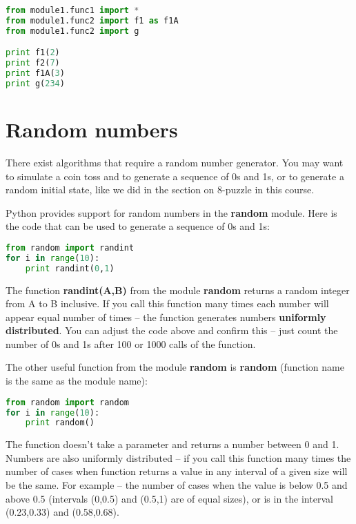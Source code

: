 \begin{lstlisting}[language=Python,style=codelst2,caption={Python: accessing module functions - 3}]
from module1.func1 import *
from module1.func2 import f1 as f1A
from module1.func2 import g

print f1(2)
print f2(7)
print f1A(3)
print g(234)
\end{lstlisting}

\section{Random numbers}

There exist algorithms that require a random number generator.
You may want to simulate a coin toss and to generate a sequence
of 0s and 1s, or to generate a random initial state, like we did in
the section on 8-puzzle in this course. 

Python provides support for random numbers in the \textbf{random}
module. Here is the code that can be used to generate a sequence of
0s and 1s:

\newpage

\begin{lstlisting}[language=Python,style=codelst2,caption={Python: random numbers, simulating a coin toss}]
from random import randint
for i in range(10):
    print randint(0,1)
\end{lstlisting}
The function \textbf{randint(A,B)} from the module \textbf{random}
returns a random integer from A to B inclusive. If you call this
function many times each number will appear equal number of times --
the function generates numbers \textbf{uniformly distributed}.
You can adjust the code above and confirm this -- just count the number 
of 0s and 1s after 100 or 1000 calls of the function.

The other useful function from the module \textbf{random} is
\textbf{random} (function name is the same as the module name):

\begin{lstlisting}[language=Python,style=codelst2,caption={Python: random numbers in the interval (0,1)}]
from random import random
for i in range(10):
    print random()
\end{lstlisting}
The function doesn't take a parameter and returns a number between 0 and 1.
Numbers are also uniformly distributed -- if you call this function 
many times the number of cases when function returns a value in any 
interval of a given size will be the same. For example -- the number
of cases when the value is below 0.5 and above 0.5 (intervals (0,0.5)
and (0.5,1) are of equal sizes), or is in the interval (0.23,0.33) 
and (0.58,0.68).


